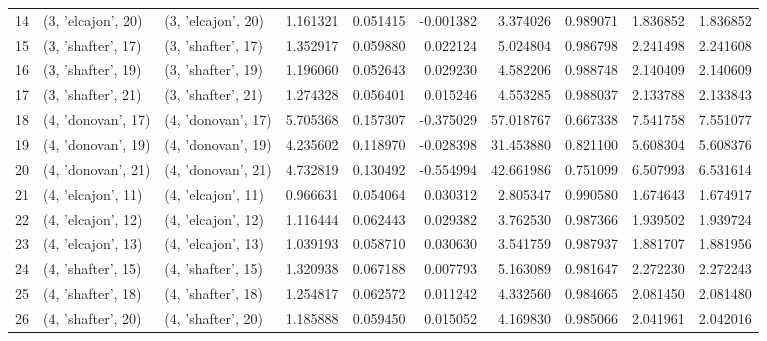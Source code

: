 \begin{tabular}{lllrrrrrrr}
14 &  (3, 'elcajon', 20) &  (3, 'elcajon', 20) &  1.161321 &  0.051415 & -0.001382 &   3.374026 &  0.989071 &  1.836852 &  1.836852 \\
15 &  (3, 'shafter', 17) &  (3, 'shafter', 17) &  1.352917 &  0.059880 &  0.022124 &   5.024804 &  0.986798 &  2.241498 &  2.241608 \\
16 &  (3, 'shafter', 19) &  (3, 'shafter', 19) &  1.196060 &  0.052643 &  0.029230 &   4.582206 &  0.988748 &  2.140409 &  2.140609 \\
17 &  (3, 'shafter', 21) &  (3, 'shafter', 21) &  1.274328 &  0.056401 &  0.015246 &   4.553285 &  0.988037 &  2.133788 &  2.133843 \\
18 &  (4, 'donovan', 17) &  (4, 'donovan', 17) &  5.705368 &  0.157307 & -0.375029 &  57.018767 &  0.667338 &  7.541758 &  7.551077 \\
19 &  (4, 'donovan', 19) &  (4, 'donovan', 19) &  4.235602 &  0.118970 & -0.028398 &  31.453880 &  0.821100 &  5.608304 &  5.608376 \\
20 &  (4, 'donovan', 21) &  (4, 'donovan', 21) &  4.732819 &  0.130492 & -0.554994 &  42.661986 &  0.751099 &  6.507993 &  6.531614 \\
21 &  (4, 'elcajon', 11) &  (4, 'elcajon', 11) &  0.966631 &  0.054064 &  0.030312 &   2.805347 &  0.990580 &  1.674643 &  1.674917 \\
22 &  (4, 'elcajon', 12) &  (4, 'elcajon', 12) &  1.116444 &  0.062443 &  0.029382 &   3.762530 &  0.987366 &  1.939502 &  1.939724 \\
23 &  (4, 'elcajon', 13) &  (4, 'elcajon', 13) &  1.039193 &  0.058710 &  0.030630 &   3.541759 &  0.987937 &  1.881707 &  1.881956 \\
24 &  (4, 'shafter', 15) &  (4, 'shafter', 15) &  1.320938 &  0.067188 &  0.007793 &   5.163089 &  0.981647 &  2.272230 &  2.272243 \\
25 &  (4, 'shafter', 18) &  (4, 'shafter', 18) &  1.254817 &  0.062572 &  0.011242 &   4.332560 &  0.984665 &  2.081450 &  2.081480 \\
26 &  (4, 'shafter', 20) &  (4, 'shafter', 20) &  1.185888 &  0.059450 &  0.015052 &   4.169830 &  0.985066 &  2.041961 &  2.042016 \\
\bottomrule
\end{tabular}
